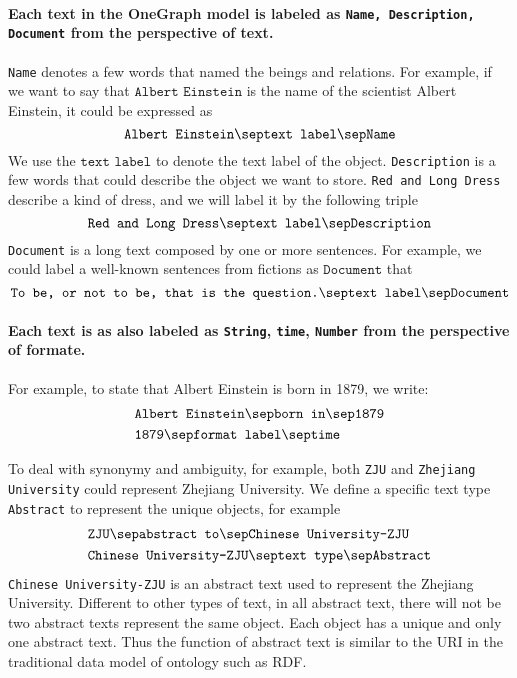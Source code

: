\paragraph{Each text in the OneGraph model is labeled as \texttt{Name, Description, Document} from the perspective of text.} \texttt{Name} denotes a few words that named the beings and relations. For example, if we want to say that $\texttt{Albert Einstein}$ is the name of the scientist Albert Einstein,  it could be expressed as
$$ \texttt{Albert Einstein} \sep \texttt{text label} \sep \texttt{Name}$$
We use the $\texttt{text label}$ to denote the text label of the object.
\texttt{Description} is a few words that could describe the object we want to store. \texttt{Red and Long Dress} describe a kind of dress, and we will label it by the following triple
$$ \texttt{Red and Long Dress} \sep \texttt{text label}\sep \texttt{Description}$$ 
\texttt{Document} is a long text composed by one or more sentences. For example, we could label a well-known sentences from fictions as $\texttt{Document}$ that 
$$\texttt{To be, or not to be, that is the question.} \sep \texttt{text label} \sep \texttt{Document}$$
\paragraph{Each text is as also labeled as \texttt{String}, \texttt{time}, \texttt{Number} from the perspective of formate.} For example, to state that Albert Einstein is born in 1879, we write:
\begin{align}
& \texttt{Albert Einstein} \sep \texttt{born in} \sep \texttt{1879} \nonumber\\
&\texttt{1879} \sep \texttt{format label} \sep \texttt{time} \nonumber
\end{align}

To deal with synonymy and ambiguity, for example, both \texttt{ZJU} and \texttt{Zhejiang University} could represent Zhejiang University. We define a specific text type \texttt{Abstract} to represent the unique objects, for example
\begin{align}
    & \texttt{ZJU} \sep \texttt{abstract to} \sep \texttt{Chinese University-ZJU} \nonumber\\
    & \texttt{Chinese University-ZJU} \sep \texttt{text type} \sep \texttt{Abstract} \nonumber
\end{align}
\texttt{Chinese University-ZJU} is an abstract text used to represent the Zhejiang University. Different to other types of text, in all abstract text, there will not be two abstract texts represent the same object. Each object has a unique and only one abstract text. Thus the function of abstract text is similar to the URI in the traditional data model of ontology such as RDF. 

